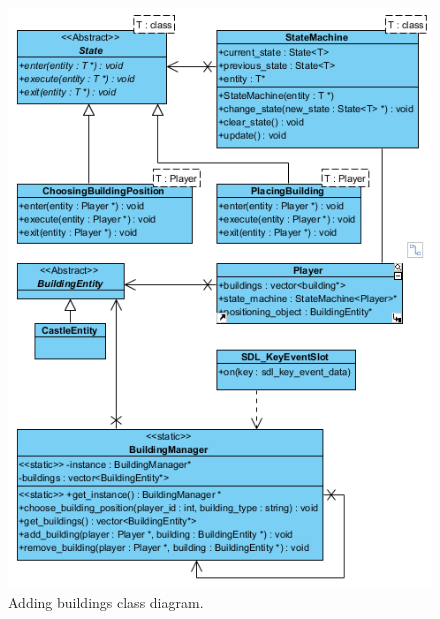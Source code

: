 \begin{figure}[!htb]
    \centering
    \includegraphics{res/adding-buildings/States-ClassDiagram.png}
    \caption{Adding buildings class diagram.}\label{fig:classdiagram-addingbuildings}
\end{figure}
\clearpage



